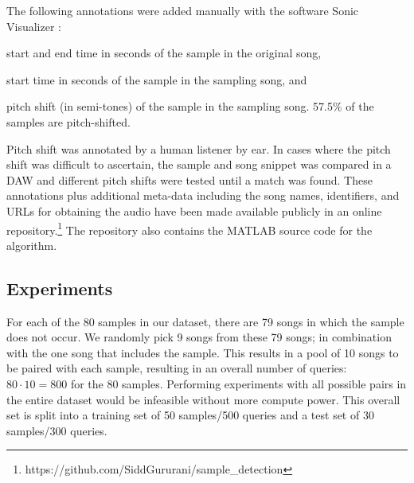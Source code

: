 \documentclass{article}
\begin{document}
The following annotations were added manually with the software Sonic Visualizer \cite{SonicVisualiser}:
\begin{inparaenum}[(i)]
    \item   start and end time in seconds of the sample in the original song,
    \item   start time in seconds of the sample in the sampling song, and
    \item   pitch shift (in semi-tones) of the sample in the sampling song. 57.5\% of the samples are pitch-shifted.
\end{inparaenum}
Pitch shift was annotated by a human listener by ear. In cases where the pitch shift was difficult to ascertain, the sample and song snippet was compared in a DAW and different pitch shifts were tested until a match was found.
These annotations plus additional meta-data including the song names, identifiers, and URLs for obtaining the audio have been made available publicly in an online repository.\footnote{https://github.com/SiddGururani/sample\_detection} The repository also contains the MATLAB source code for the algorithm. 

\subsection{Experiments}
\label{exp}
For each of the 80 samples in our dataset, there are 79 songs in which the sample does not occur. We randomly pick 9 songs from these 79 songs; in combination with the one song that includes the sample. This results in a pool of 10 songs to be paired with each sample, resulting in an overall number of queries: $80\cdot10 = 800$ for the $80$ samples. Performing experiments with all possible pairs in the entire dataset would be infeasible without more compute power.
%
This overall set is split into a training set of 50 samples/500 queries and a test set of 30 samples/300 queries.
\end{document}

